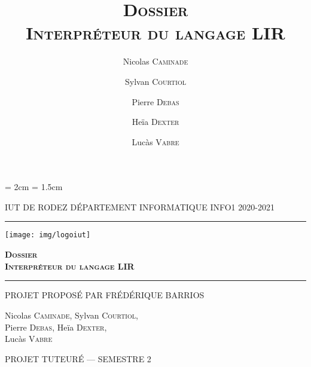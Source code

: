 \documentclass[12pt,a4paper,titlepage,openright]{report}
\title{\textsc{\textbf{ Dossier
            \\Interpréteur du langage LIR}
}}
\date{}
\author{Nicolas \textsc{Caminade} \and Sylvan \textsc{Courtiol} \and Pierre
    \textsc{Debas} \and Heïa \textsc{Dexter} \and Lucàs \textsc{Vabre} }
\begin{document}
    \lhead{\leftmark}

    \cfoot{\thepage}
    \headheight = 2cm
    \headsep = 1.5cm

    \begin{titlepage}
        \selectfont

        \begin{center}\normalsize
            \MakeUppercase{IUT de Rodez \hfill Département informatique
                \hfill INFO1 2020-2021}
        \end{center}
        \vspace*{0.1cm}
        \hrule
        \vspace*{0.2cm}
        \begin{flushright}
            \texttt{[image: img/logoiut]}
        \end{flushright}
        \vspace*{2cm}
        \begin{flushright}\Huge
            \textsc{\textbf{ Dossier
                    \\Interpréteur du langage LIR}}
        \end{flushright}
        \hrule
        \begin{flushleft}
            \MakeUppercase{Projet proposé par Frédérique Barrios}
        \end{flushleft}
        \vspace*{2cm}
        \begin{center}\Large
            Nicolas \textsc{Caminade}, Sylvan \textsc{Courtiol},\\
            Pierre \textsc{Debas}, Heïa \textsc{Dexter}, \\
            Lucàs \textsc{Vabre}
        \end{center}
        \vfill
        \begin{center}\normalsize
            \MakeUppercase{Projet tuteuré --- Semestre 2}
        \end{center}
    \end{titlepage}

    \renewcommand{\contentsname}{Sommaire}
    \tableofcontents

\end{document}
